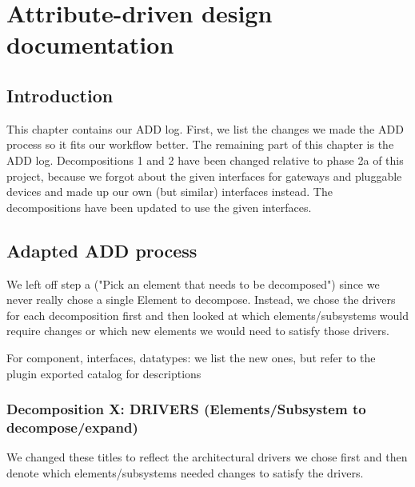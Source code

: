 \documentclass[english]{sareport}
\begin{document}
\appendix
\chapter{Attribute-driven design documentation}\label{sec:add}
    \section{Introduction}
        This chapter contains our ADD log. First, we list the changes we
        made the ADD process so it fits our workflow better. The remaining part
        of this chapter is the ADD log. Decompositions 1 and 2 have been changed
        relative to phase 2a of this project, because we forgot about the given
        interfaces for gateways and pluggable devices and made up our own
        (but similar) interfaces instead. The decompositions have been updated
        to use the given interfaces.

    \section{Adapted ADD process}
        We left off step a ("Pick an element that needs to be decomposed") since we
        never really chose a single Element to decompose. Instead, we chose the drivers
        for each decomposition first and then looked at which elements/subsystems
        would require changes or which new elements we would need to satisfy those drivers.

        For component, interfaces, datatypes: we list the new ones, but refer
        to the plugin exported catalog for descriptions

        \subsection*{Decomposition X: DRIVERS (Elements/Subsystem to decompose/expand)}
            We changed these titles to reflect the architectural drivers we chose first and then
            denote which elements/subsystems needed changes to satisfy the drivers.

\end{document}
